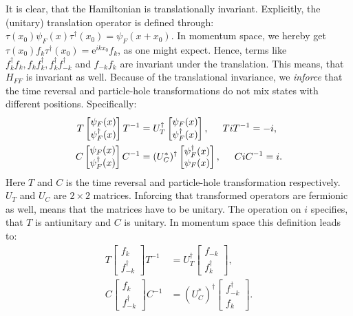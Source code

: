 It is clear, that the Hamiltonian is translationally invariant. Explicitly, the (unitary) translation operator is defined through: $\tau(x_0)\psi_F(x)\tau^\dagger (x_0) = \psi_F(x+x_0)$. In momentum space, we hereby get $\tau(x_0) f_k \tau^\dagger(x_0) = \text{e}^{ikx_0}f_k$, as one might expect. Hence, terms like $f^\dagger_k f_k, f_k f^\dagger_k, f^\dagger_kf^\dagger_{-k}$ and $f_{-k}f_k$ are invariant under the translation. This means, that $H_{FF}$ is invariant as well. Because of the translational invariance, we \textit{inforce} that the time reversal and particle-hole transformations do not mix states with different positions. Specifically:
\begin{align}
T \begin{bmatrix} \psi_F(x) \\ \psi^\dagger_F(x) \end{bmatrix} T^{-1} &= U^\dagger_T \begin{bmatrix} \psi_F(x) \\ \psi^\dagger_F(x) \end{bmatrix}, \hspace{0.5cm} TiT^{-1} = -i, \nonumber \\
C \begin{bmatrix} \psi_F(x) \\ \psi^\dagger_F(x) \end{bmatrix} C^{-1} &= (U^*_C)^\dagger \begin{bmatrix} \psi^\dagger_F(x) \\ \psi_F(x) \end{bmatrix}, \hspace{0.5cm} CiC^{-1} = i.  
\label{eq.TRandPH.realspace}
\end{align}
Here $T$ and $C$ is the time reversal and particle-hole transformation respectively. $U_T$ and $U_C$ are $2\times 2$ matrices. Inforcing that transformed operators are fermionic as well, means that the matrices have to be unitary. The operation on $i$ specifies, that $T$ is antiunitary and $C$ is unitary. In momentum space this definition leads to:
\begin{align}
T \begin{bmatrix} f_k \\ f^\dagger_{-k} \end{bmatrix} T^{-1} &= U^\dagger_T \begin{bmatrix} f_{-k} \\ f^\dagger_{k} \end{bmatrix}, \nonumber \\
C \begin{bmatrix} f_k \\ f^\dagger_{-k} \end{bmatrix} C^{-1} &= (U^*_C)^\dagger \begin{bmatrix} f^\dagger_{-k} \\ f_{k} \end{bmatrix}. 
\label{eq.TRandPH.momentumspace}
\end{align}
